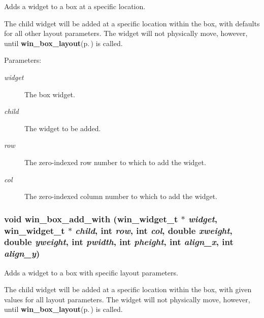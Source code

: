 Adds a widget to a box at a specific location. 

The child widget will be added at a specific location within the box, with defaults for all other layout parameters. The widget will not physically move, however, until {\bf win\_\-box\_\-layout}{\rm (p.\,\pageref{winbox_8h_a10})} is called.

\begin{Desc}
\item[Parameters:]
\begin{description}
\item[{\em widget}]The box widget. \item[{\em child}]The widget to be added. \item[{\em row}]The zero-indexed row number to which to add the widget. \item[{\em col}]The zero-indexed column number to which to add the widget. \end{description}
\end{Desc}
\subsubsection{\setlength{\rightskip}{0pt plus 5cm}void win\_\-box\_\-add\_\-with ({\bf win\_\-widget\_\-t} $\ast$ {\em widget}, {\bf win\_\-widget\_\-t} $\ast$ {\em child}, int {\em row}, int {\em col}, double {\em xweight}, double {\em yweight}, int {\em pwidth}, int {\em pheight}, int {\em align\_\-x}, int {\em align\_\-y})}\label{winbox_8h_a8}


Adds a widget to a box with specific layout parameters. 

The child widget will be added at a specific location within the box, with given values for all layout parameters. The widget will not physically move, however, until {\bf win\_\-box\_\-layout}{\rm (p.\,\pageref{winbox_8h_a10})} is called.

